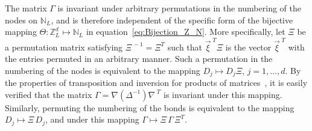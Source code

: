 \documentclass{cmslatex}
\begin{document}
The matrix $\Gamma$ is invariant under arbitrary permutations in the
numbering of the nodes on $\mathbb{N}_L$, and is therefore independent
of the specific form of the bijective mapping
$\Theta:\mathbb{Z}_L^d\mapsto\mathbb{N}_L$ in
equation~\eqref{eq:Bijection_Z_N}. More specifically, let $\Xi$ be a
permutation 
matrix satisfying $\Xi^{\,-1}=\Xi^T$ such that $\vec{\xi}^{\; T}\Xi$ is the vector
$\vec{\xi}^{\; T}$ with the entries permuted in an arbitrary manner. Such
a permutation in the numbering of the nodes is equivalent to the
mapping $D_j\mapsto D_j\Xi$, $j=1,\ldots,d$. By the properties of transposition and
inversion for products of matrices~\cite{Horn_Johnson-1990}, it is
easily verified that the matrix $\Gamma=\nabla(\Delta^{-1})\nabla^{\;T}$ is invariant
under this mapping. Similarly, permuting the numbering of the bonds is
equivalent to the mapping $D_j\mapsto \Xi\,D_j$, and under this mapping $\Gamma\mapsto
\Xi\,\Gamma\, \Xi^T$. 
\end{document}
